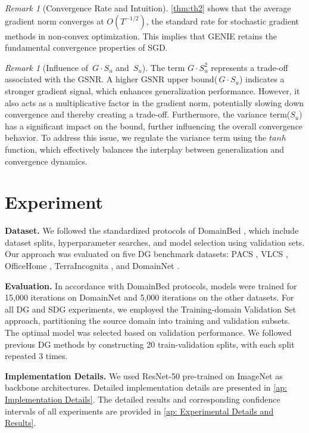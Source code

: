 \documentclass{article}
\theoremstyle{plain}
\theoremstyle{definition}
\theoremstyle{remark}
\newtheorem{remark}[theorem]{Remark}
\begin{document}
\begin{remark}[Convergence Rate and Intuition]
\label{rem:conv-rate}
\cref{thm:th2} shows that the average gradient norm converges at \(O(T^{-1/2})\), the standard rate for stochastic gradient methods in non-convex optimization. This implies that GENIE retains the fundamental convergence properties of SGD. 
\end{remark}

\begin{remark}[Influence of \(\,G \cdot S_u\) and \(\,S_u\)]

The term $G\cdot S_u^{2}$ represents a trade-off associated with the GSNR. A higher GSNR upper bound(\(\,G \cdot S_u\)) indicates a stronger gradient signal, which enhances generalization performance. However, it also acts as a multiplicative factor in the gradient norm, potentially slowing down convergence and thereby creating a trade-off. Furthermore, the variance term($S_u$)  has a significant impact on the bound, further influencing the overall convergence behavior. To address this issue, we regulate the variance term using the 
$tanh$ function, which effectively balances the interplay between generalization and convergence dynamics. 
\end{remark}

\section{Experiment}
\textbf{Dataset.} We followed the standardized protocols of DomainBed \cite{domainbed}, which include dataset splits, hyperparameter searches, and model selection using validation sets. Our approach was evaluated on five DG benchmark datasets: PACS \cite{pacs}, VLCS \cite{vlcs}, OfficeHome \cite{officehome}, TerraIncognita \cite{terra}, and DomainNet \cite{domainnet}.

\textbf{Evaluation.} In accordance with DomainBed protocols, models were trained for 15,000 iterations on DomainNet and 5,000 iterations on the other datasets. For all DG and SDG experiments, we employed the Training-domain Validation Set approach, partitioning the source domain into training and validation subsets. The optimal model was selected based on validation performance. We followed previous DG methods by constructing 20 train-validation splits, with each split repeated 3 times. 

\textbf{Implementation Details.} We used ResNet-50 \cite{resnet} pre-trained on ImageNet \cite{imagenet} as backbone architectures. Detailed implementation details are presented in \cref{ap: Implementation Details}. The detailed results and corresponding confidence intervals of all experiments are provided in \cref{ap: Experimental Details and Results}.
\end{document}
